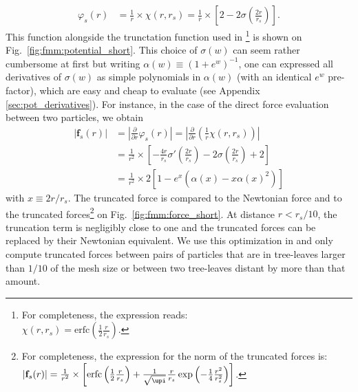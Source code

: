 \begin{align}
  \varphi_s(r) &= \frac{1}{r} \times \chi(r, r_s) = \frac{1}{r}\times\left[2 - 2\sigma\left(\frac{2r}{r_s}\right)\right].%
\end{align}
This function alongside the trunctation function used in
\gadget\footnote{For completeness, the \gadget expression reads:\\
  $\chi(r, r_s) = \mathrm{erfc}(\frac{1}{2}\frac{r}{r_s})$.} is shown
on Fig.~\ref{fig:fmm:potential_short}. This choice of $\sigma(w)$ can
seem rather cumbersome at first but writing
$\alpha(w) \equiv (1+e^w)^{-1}$, one can expressed all derivatives of
$\sigma(w)$ as simple polynomials in $\alpha(w)$ (with an identical
$e^w$ pre-factor), which are easy and cheap to evaluate (see Appendix
\ref{sec:pot_derivatives}). For instance, in the case of the direct
force evaluation between two particles, we obtain
\begin{align}
  |\mathbf{f}_s(r)| &= \left|\frac{\partial}{\partial r}\varphi_s(r)\right|
                      = \left|\frac{\partial}{\partial r}\left(\frac{1}{r} \chi(r, r_s)\right) \right|\nonumber \\
  &=  \frac{1}{r^2}\times\left[-\frac{4r}{r_s}\sigma'\left(\frac{2r}{r_s}\right) -
    2\sigma\left(\frac{2r}{r_s}\right) + 2\right] \nonumber \\
  &=
    \frac{1}{r^2}\times 2 \left[1 - e^x\left(\alpha(x) - x\alpha(x)^2\right) \right]
\end{align}
with $x\equiv2r/r_s$. The truncated force is compared to the Newtonian
force and to the \gadget truncated forces\footnote{For completeness,
  the \gadget expression for the norm of the truncated forces is:
  $|\mathbf{f}_s(r)| = \frac{1}{r^2} \times
  \left[\mathrm{erfc}\left(\frac{1}{2}\frac{r}{r_s}\right) +
    \frac{1}{\sqrt{\upi}}\frac{r}{r_s}\exp\left(-\frac{1}{4}\frac{r^2}{r_s^2}\right)\right]$.}
on Fig.~\ref{fig:fmm:force_short}. At distance $r<r_s/10$, the
truncation term is negligibly close to one and the truncated forces
can be replaced by their Newtonian equivalent. We use this
optimization in \swift and only compute truncated forces between pairs
of particles that are in tree-leaves larger than $1/10$ of the mesh
size or between
two tree-leaves distant by more than that amount.\\

